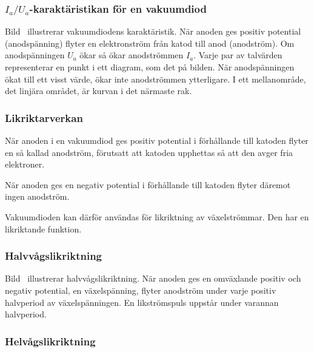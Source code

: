 \subsubsection{\(I_a/U_a\)-karaktäristikan för en vakuumdiod}


Bild~ illustrerar vakuumdiodens karaktäristik.
När anoden ges positiv potential (anodspänning) flyter en elektronström från
katod till anod (anodström).
Om anodspänningen \(U_a\) ökar så ökar anodströmmen \(I_a\).
Varje par av talvärden representerar en punkt i ett diagram, som det på bilden.
När anodspänningen ökat till ett visst värde, ökar inte anodströmmen
ytterligare.
I ett mellanområde, det linjära området, är kurvan i det närmaste rak.

\subsubsection{Likriktarverkan}

När anoden i en vakuumdiod ges positiv potential i förhållande till katoden
flyter en så kallad anodström, förutsatt att katoden upphettas så att den avger
fria elektroner.

När anoden ges en negativ potential i förhållande till katoden flyter däremot
ingen anodström.

Vakuumdioden kan därför användas för likriktning av växelströmmar.
Den har en likriktande funktion.

\newpage
\subsubsection{Halvvågslikriktning}

Bild~ illustrerar halvvågslikriktning.
När anoden ges en omväxlande positiv och negativ potential, en växelspänning,
flyter anodström under varje positiv halvperiod av växelspänningen.
En likströmspuls uppstår under varannan halvperiod.

\newpage
{}

\subsubsection{Helvågslikriktning}

